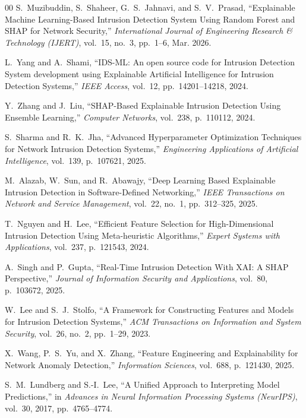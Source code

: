 \documentclass[conference]{IEEEtran}
\begin{document}
\begin{thebibliography}{00}
S.~Muzibuddin, S.~Shaheer, G.~S.~Jahnavi, and S.~V.~Prasad, ``Explainable Machine Learning-Based Intrusion Detection System Using Random Forest and SHAP for Network Security,'' \textit{International Journal of Engineering Research \& Technology (IJERT)}, vol.~15, no.~3, pp.~1--6, Mar. 2026.

L.~Yang and A.~Shami, ``IDS-ML: An open source code for Intrusion Detection System development using Explainable Artificial Intelligence for Intrusion Detection Systems,'' \textit{IEEE Access}, vol.~12, pp.~14201--14218, 2024.

Y.~Zhang and J.~Liu, ``SHAP-Based Explainable Intrusion Detection Using Ensemble Learning,'' \textit{Computer Networks}, vol.~238, p.~110112, 2024.

S.~Sharma and R.~K.~Jha, ``Advanced Hyperparameter Optimization Techniques for Network Intrusion Detection Systems,'' \textit{Engineering Applications of Artificial Intelligence}, vol.~139, p.~107621, 2025.

M.~Alazab, W.~Sun, and R.~Abawajy, ``Deep Learning Based Explainable Intrusion Detection in Software-Defined Networking,'' \textit{IEEE Transactions on Network and Service Management}, vol.~22, no.~1, pp.~312--325, 2025.

T.~Nguyen and H.~Lee, ``Efficient Feature Selection for High-Dimensional Intrusion Detection Using Meta-heuristic Algorithms,'' \textit{Expert Systems with Applications}, vol.~237, p.~121543, 2024.

A.~Singh and P.~Gupta, ``Real-Time Intrusion Detection With XAI: A SHAP Perspective,'' \textit{Journal of Information Security and Applications}, vol.~80, p.~103672, 2025.

W.~Lee and S.~J.~Stolfo, ``A Framework for Constructing Features and Models for Intrusion Detection Systems,'' \textit{ACM Transactions on Information and System Security}, vol.~26, no.~2, pp.~1--29, 2023.

X.~Wang, P.~S.~Yu, and X.~Zhang, ``Feature Engineering and Explainability for Network Anomaly Detection,'' \textit{Information Sciences}, vol.~688, p.~121430, 2025.

S.~M.~Lundberg and S.-I.~Lee, ``A Unified Approach to Interpreting Model Predictions,'' in \textit{Advances in Neural Information Processing Systems (NeurIPS)}, vol.~30, 2017, pp.~4765--4774.


\end{thebibliography}
\end{document}
